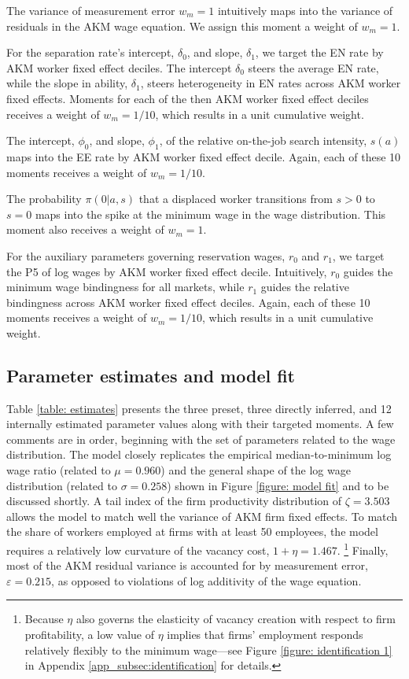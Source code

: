 The variance of measurement error $w_{m}=1$ intuitively maps into the variance of residuals in the AKM wage equation. We assign this moment a weight of $w_{m} = 1$.

For the separation rate's intercept, $\delta_0$, and slope, $\delta_1$, we target the EN rate by AKM worker fixed effect deciles. The intercept $\delta_0$ steers the average EN rate, while the slope in ability, $\delta_1$, steers heterogeneity in EN rates across AKM worker fixed effects. Moments for each of the then AKM worker fixed effect deciles receives a weight of $w_{m}=1/10$, which results in a unit cumulative weight.

The intercept, $\phi_0$, and slope, $\phi_1$, of the relative on-the-job search intensity, $s(a)$ maps into the EE rate by AKM worker fixed effect decile. Again, each of these 10 moments receives a weight of $w_{m}=1/10$.

The probability $\pi(0|a,s)$ that a displaced worker transitions from $s>0$ to $s=0$ maps into the spike at the minimum wage in the wage distribution. This moment also receives a weight of $w_{m}=1$.

For the auxiliary parameters governing reservation wages, $r_0$ and $r_1$, we target the P5 of log wages by AKM worker fixed effect decile. Intuitively, $r_0$ guides the minimum wage bindingness for all markets, while $r_1$ guides the relative bindingness across AKM worker fixed effect deciles. Again, each of these 10 moments receives a weight of $w_{m}=1/10$, which results in a unit cumulative weight.




\subsection{Parameter estimates and model fit\label{subsec:parameter_estimates_fit}}

Table \ref{table: estimates} presents the three preset, three directly inferred, and 12 internally estimated parameter values along with their targeted moments. A few comments are in order, beginning with the set of parameters related to the wage distribution. The model closely replicates the empirical median-to-minimum log wage ratio (related to $\mu=0.960$) and the general shape of the log wage distribution (related to $\sigma=0.258$) shown in Figure \ref{figure: model fit} and to be discussed shortly. A tail index of the firm productivity distribution of $\zeta = 3.503$ allows the model to match well the variance of AKM firm fixed effects. To match the share of workers employed at firms with at least 50 employees, the model requires a relatively low curvature of the vacancy cost, $1 + \eta = 1.467$.%
%
\footnote{Because $\eta$ also governs the elasticity of vacancy creation with respect to firm profitability, a low value of $\eta$ implies that firms' employment responds relatively flexibly to the minimum wage---see Figure \ref{figure: identification 1} in Appendix \ref{app_subsec:identification} for details.} %
%
Finally, most of the AKM residual variance is accounted for by measurement error, $\varepsilon=0.215$, as opposed to violations of log additivity of the wage equation.

